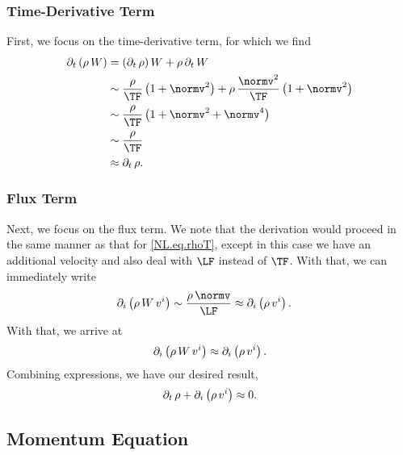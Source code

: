 \subsubsection{Time-Derivative Term}
First, we focus on the time-derivative term, for which we find
\begin{align}
  \p_{t}\left(\rho\,W\right)
  &=\left(\p_{t}\,\rho\right)W+\rho\,\p_{t}\,W \\
  &\sim\frac{\rho}{\TF}\left(1+\normv^{2}\right)
  +\rho\,\frac{\normv^{2}}{\TF}\left(1+\normv^{2}\right) \\
  &\sim\frac{\rho}{\TF}\left(1+\normv^{2}+\normv^{4}\right) \\
  &\sim\frac{\rho}{\TF} \\
  &\approx\p_{t}\,\rho.
  \label{NL.eq.rhoT}
\end{align}

\subsubsection{Flux Term}
Next, we focus on the flux term.
We note that the derivation would proceed in the same manner as that for
\eqref{NL.eq.rhoT}, except in this case we have an additional velocity
and also deal with $\LF$ instead of $\TF$.
With that, we can immediately write
\begin{align}
  \p_{i}\left(\rho\,W\,v^{i}\right)
  &\sim\frac{\rho\,\normv}{\LF}\approx\p_{i}\left(\rho\,v^{i}\right).
\end{align}
With that, we arrive at
\begin{equation}
  \partial_{i}\left(\rho\,W\,v^{i}\right)
  \approx\partial_{i}\left(\rho\,v^{i}\right).
\end{equation}
Combining expressions, we have our desired result,
\begin{equation}
  \partial_{t}\,\rho+\partial_{i}\left(\rho\,v^{i}\right)\approx0.
\end{equation}

\subsection{Momentum Equation}

